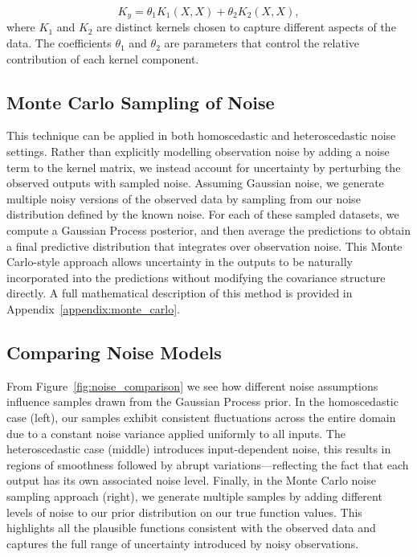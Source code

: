 \documentclass{ucdgradtaughtthesis}
\begin{document}
\begin{equation}
    K_y = \theta_1 K_1(X, X) + \theta_2 K_2(X, X),
    \label{eq:additive_kernel}
\end{equation}
where \( K_1 \) and \( K_2 \) are distinct kernels chosen to capture different aspects of the data. 
The coefficients \( \theta_1 \) and \( \theta_2 \) are parameters that control the relative contribution of each kernel component.

\subsection{Monte Carlo Sampling of Noise}  

This technique can be applied in both homoscedastic and heteroscedastic noise settings. Rather than explicitly modelling observation noise by adding a noise term to the kernel matrix, we instead account for uncertainty by perturbing the observed outputs with sampled noise.
Assuming Gaussian noise, we generate multiple noisy versions of the observed data by sampling from our noise distribution defined by the known noise. For each of these sampled datasets, we compute a Gaussian Process posterior, and then average the predictions to obtain a final predictive distribution that integrates over observation noise.
This Monte Carlo-style approach allows uncertainty in the outputs to be naturally incorporated into the predictions without modifying the covariance structure directly. A full mathematical description of this method is provided in Appendix~\ref{appendix:monte_carlo}.

%
%
\subsection{Comparing Noise Models}
From Figure~\ref{fig:noise_comparison} we see how different noise assumptions influence samples drawn from the Gaussian Process prior. 
In the homoscedastic case (left), our samples exhibit consistent fluctuations across the entire domain due to a constant noise variance applied uniformly to all inputs. 
The heteroscedastic case (middle) introduces input-dependent noise, this results in regions of smoothness followed by abrupt variations—reflecting the fact that each output has its own associated noise level.
Finally, in the Monte Carlo noise sampling approach (right), we generate multiple samples by adding different levels of noise to our prior distribution on our true function values.
This highlights all the plausible functions consistent with the observed data and captures the full range of uncertainty introduced by noisy observations.
\end{document}
